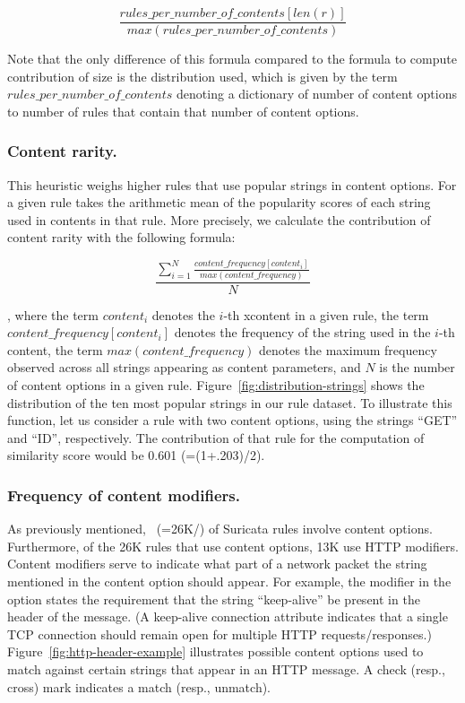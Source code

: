 \documentclass[sigconf,review, anonymous]{acmart}
\begin{document}
\[\frac{\mathit{rules\_per\_number\_of\_contents[len(r)]}}{\mathit{max(rules\_per\_number\_of\_contents)}}\]

\noindent
Note that the only difference of this formula compared to the formula
to compute contribution of size is the distribution used, which is
given by the term $\mathit{rules\_per\_number\_of\_contents}$ denoting
a dictionary of number of content options to number of rules that
contain that number of content options.

\subsubsection{Content rarity.} 
This heuristic weighs higher rules that use popular strings in content
options. For a given rule \tname{} takes the arithmetic mean of the
popularity scores of each string used in contents in that rule. More
precisely, we calculate the contribution of content rarity with the
following formula:

\[\frac{\sum_{i=1}^{N}\frac{\mathit{content\_frequency[content_i]}}{\mathit{max(content\_frequency)}}}{N}\]

\noindent
, where the term $\mathit{content_i}$ denotes the $i$-th xcontent in a
given rule, the term $\mathit{content\_frequency[\mathit{content_i}]}$
denotes the frequency of the string used in the $i$-th content, the
term $\mathit{max(content\_frequency)}$ denotes the maximum frequency
observed across all strings appearing as content parameters, and $N$
is the number of content options in a given
rule. Figure~\ref{fig:distribution-strings} shows the distribution of
the ten most popular strings in our rule dataset. To illustrate this
function, let us consider a rule with two content options, using the
strings ``GET'' and ``ID'', respectively. The contribution of that
rule for the computation of similarity score would be 0.601
(=(1+.203)/2).



\subsubsection{Frequency of content modifiers.} As previously
mentioned, \percRulesWithContent\ (=26K/\numrulessuri) of Suricata
rules involve content options. Furthermore, of the 26K rules that use
content options, 13K use HTTP modifiers.  Content modifiers
serve to indicate what part of a network packet the string mentioned
in the content option should appear. For example, the modifier
 in the option  states the requirement that the string ``keep-alive''
be present in the header of the message. (A keep-alive connection
attribute indicates that a single TCP connection should remain open
for multiple HTTP requests/responses.)
Figure~\ref{fig:http-header-example} illustrates possible content
options used to match against certain strings that appear in an HTTP
message. A check (resp., cross) mark indicates a match (resp.,
unmatch).
\end{document}

